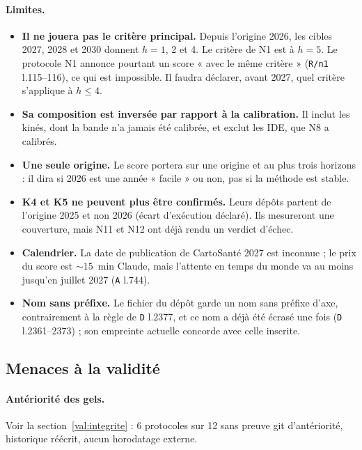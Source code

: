 \paragraph{Limites.}
\begin{itemize}
  \item \textbf{Il ne jouera pas le critère principal.} Depuis l'origine 2026, les cibles 2027,
        2028 et 2030 donnent $h = 1$, 2 et 4\derive. Le critère de N1 est à $h = 5$\suppose. Le
        protocole N1 annonce pourtant un score « avec le même critère » (\texttt{R/n1}
        l.115--116), ce qui est impossible. Il faudra déclarer, avant 2027, quel critère s'applique
        à $h \le 4$.
  \item \textbf{Sa composition est inversée par rapport à la calibration.} Il inclut les kinés,
        dont la bande n'a jamais été calibrée, et exclut les IDE, que N8 a calibrés.
  \item \textbf{Une seule origine.} Le score portera sur une origine et au plus trois horizons :
        il dira si 2026 est une année « facile » ou non, pas si la méthode est stable.
  \item \textbf{K4 et K5 ne peuvent plus être confirmés.} Leurs dépôts partent de l'origine 2025
        et non 2026 (écart d'exécution déclaré). Ils mesureront une couverture, mais N11 et N12
        ont déjà rendu un verdict d'échec.
  \item \textbf{Calendrier.} La date de publication de CartoSanté 2027 est inconnue ; le prix du
        score est $\sim 15$\suppose{}~min Claude, mais l'attente en temps du monde va au moins
        jusqu'en juillet 2027 (\texttt{A} l.744).
  \item \textbf{Nom sans préfixe.} Le fichier du dépôt garde un nom sans préfixe d'axe, contrairement
        à la règle de \texttt{D} l.2377, et ce nom a déjà été écrasé une fois (\texttt{D}
        l.2361--2373) ; son empreinte actuelle concorde avec celle inscrite.
\end{itemize}

\subsection{Menaces à la validité}\label{val:menaces}

\paragraph{Antériorité des gels.} Voir la section~\ref{val:integrite} : 6\mesure{} protocoles sur
12\mesure{} sans preuve git d'antériorité, historique réécrit, aucun horodatage externe.

